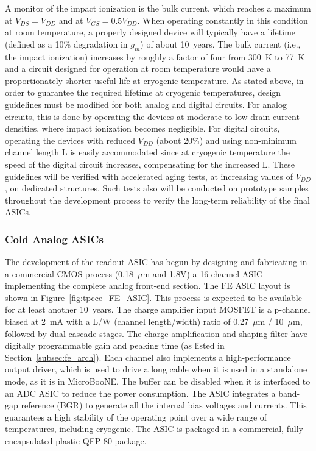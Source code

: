 A monitor of the impact ionization is the bulk current, which reaches a maximum at $V_{DS} = V_{DD}$ and at $V_{GS} = 0.5 V_{DD}$.
When operating constantly in this condition at room temperature, a properly designed device 
will typically have a lifetime (defined as a 10\% degradation in $g_m$) of about 10~years. 
The bulk current (i.e., the impact ionization) increases by roughly a factor of four from 300~K to 77~K 
\cite{CMOS-reliability} and a circuit designed for operation at room temperature would have 
a proportionately shorter useful life at cryogenic temperature. As stated above, in order to guarantee 
the required lifetime at cryogenic temperatures, design guidelines must be modified for both analog 
and digital circuits. For analog circuits, this is done by operating the devices at moderate-to-low 
drain current densities, where impact ionization becomes negligible. 
%
For digital circuits, 
operating the devices with reduced $V_{DD}$ (about 20\%) and using non-minimum channel length L
is easily accommodated since at cryogenic temperature the speed of the digital circuit increases, 
compensating for the increased L.
%
These guidelines will be verified with accelerated aging tests, 
at increasing values of $V_{DD}$, on dedicated structures. Such tests also will be conducted on 
prototype samples throughout the development process to verify the long-term reliability of the final ASICs.

%
\subsubsection{Cold Analog ASICs}
\label{subsubsec:fe_CMOS_analog}

The development of the readout ASIC has begun by designing and fabricating in a commercial CMOS
process (0.18~$\mu$m and 1.8V) a 16-channel ASIC implementing the complete analog front-end section.
The FE ASIC layout is shown in Figure~\ref{fig:tpcce_FE_ASIC}.
This process is expected to be available for at least another 10~years. 
The charge amplifier input MOSFET is a p-channel biased at 2~mA with a L/W (channel length/width) ratio
of 0.27~$\mu$m / 10~$\mu$m, followed by dual cascade stages.
The charge amplification and shaping filter have digitally programmable gain and peaking time
(as listed in Section~\ref{subsec:fe_arch}).
Each channel also implements a high-performance output driver,
which is used to drive a long cable when it is used in a standalone mode, as it is in MicroBooNE.\cite{microboone-url}
The buffer can be disabled when it is interfaced to an ADC ASIC to reduce the power consumption.
The ASIC integrates a band-gap reference (BGR) to generate all the internal bias voltages and currents.
This guarantees a high stability of the operating point over a wide range of
temperatures, including cryogenic.
The ASIC is packaged in a commercial, fully encapsulated plastic QFP 80 package.


